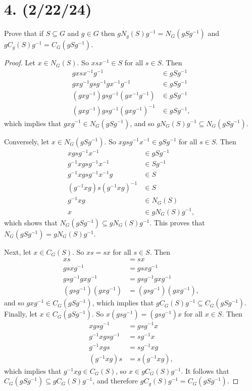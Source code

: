 \documentclass{article}
\begin{document}
\section*{4. (2/22/24)}

Prove that if $S \subseteq G$ and $g \in G$ then $gN_g(S)g^{-1} = N_G(gSg^{-1})$ and $gC_g(S)g^{-1} = C_G(gSg^{-1})$.

\begin{proof}
    Let $x \in N_G(S)$. So $xsx^{-1} \in S$ for all $s \in S$. Then
        \begin{align*}
            gxsx^{-1}g^{-1} &\in gSg^{-1} \\
            gxg^{-1}gsg^{-1}gx^{-1}g^{-1} &\in gSg^{-1} \\
            (gxg^{-1})gsg^{-1}(gx^{-1}g^{-1}) &\in gSg^{-1} \\
            (gxg^{-1})gsg^{-1}(gxg^{-1})^{-1} &\in gSg^{-1},
        \end{align*}
    which implies that $gxg^{-1} \in N_G(gSg^{-1})$, and so $gN_G(S)g^{-1} \subseteq N_G(gSg^{-1})$.

    Conversely, let $x \in N_G(gSg^{-1})$. So $xgsg^{-1}x^{-1} \in gSg^{-1}$ for all $s \in S$. Then
        \begin{align*}
            xgsg^{-1}x^{-1} &\in gSg^{-1} \\
            g^{-1}xgsg^{-1}x^{-1} &\in Sg^{-1} \\
            g^{-1}xgsg^{-1}x^{-1}g &\in S \\
            (g^{-1}xg)s(g^{-1}xg)^{-1} &\in S \\
            g^{-1}xg &\in N_G(S) \\
            x &\in gN_G(S)g^{-1},
        \end{align*}
    which shows that $N_G(gSg^{-1}) \subseteq gN_G(S)g^{-1}$. This proves that $N_G(gSg^{-1}) = gN_G(S)g^{-1}$.

    Next, let $x \in C_G(S)$. So $xs = sx$ for all $s \in S$. Then
        \begin{align*}
            xs &= sx \\
            gsxg^{-1} &= gsxg^{-1} \\
            gsg^{-1}gxg^{-1} &= gsg^{-1}gxg^{-1} \\
            (gsg^{-1})(gxg^{-1}) &= (gsg^{-1})(gxg^{-1}),
        \end{align*}
        and so $gxg^{-1} \in C_G(gSg^{-1})$, which implies that $gC_G(S)g^{-1} \subseteq C_G(gSg^{-1})$.
    Finally, let $x \in C_G(gSg^{-1})$. So $x(gsg^{-1}) = (gsg^{-1})x$ for all $x \in S$. Then
        \begin{align*}
            xgsg^{-1} &= gsg^{-1}x \\
            g^{-1}xgsg^{-1} &= sg^{-1}x \\
            g^{-1}xgs &= sg^{-1}xg \\
            (g^{-1}xg)s &= s(g^{-1}xg),
        \end{align*}
        which implies that $g^{-1}xg \in C_G(S)$, so $x \in gC_G(S)g^{-1}$. It follows that \\ $C_G(gSg^{-1}) \subseteq gC_G(S)g^{-1}$, and therefore $gC_g(S)g^{-1} = C_G(gSg^{-1})$.
\end{proof}
\end{document}
